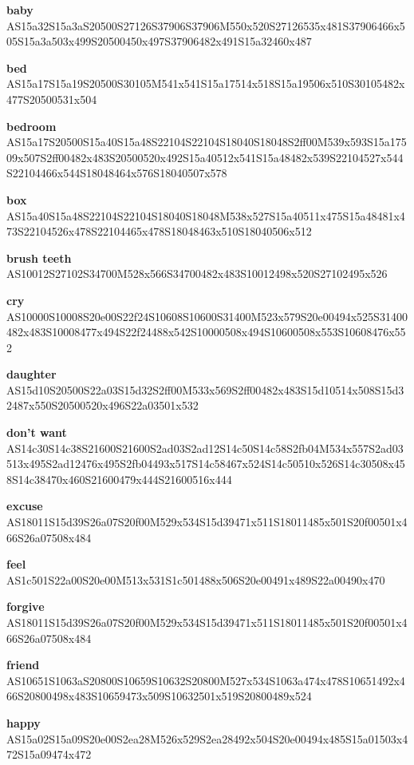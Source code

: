 \documentclass{article}
\begin{document}
\begin{glossary}
\textbf{baby}\\
AS15a32S15a3aS20500S27126S37906S37906M550x520S27126535x481S37906466x505S15a3a503x499S20500450x497S37906482x491S15a32460x487

\textbf{bed}\\
AS15a17S15a19S20500S30105M541x541S15a17514x518S15a19506x510S30105482x477S20500531x504

\textbf{bedroom}\\
AS15a17S20500S15a40S15a48S22104S22104S18040S18048S2ff00M539x593S15a17509x507S2ff00482x483S20500520x492S15a40512x541S15a48482x539S22104527x544S22104466x544S18048464x576S18040507x578

\textbf{box}\\
AS15a40S15a48S22104S22104S18040S18048M538x527S15a40511x475S15a48481x473S22104526x478S22104465x478S18048463x510S18040506x512

\textbf{brush teeth}\\
AS10012S27102S34700M528x566S34700482x483S10012498x520S27102495x526

\textbf{cry}\\
AS10000S10008S20e00S22f24S10608S10600S31400M523x579S20e00494x525S31400482x483S10008477x494S22f24488x542S10000508x494S10600508x553S10608476x552

\textbf{daughter}\\
AS15d10S20500S22a03S15d32S2ff00M533x569S2ff00482x483S15d10514x508S15d32487x550S20500520x496S22a03501x532

\textbf{don't want}\\
AS14c30S14c38S21600S21600S2ad03S2ad12S14c50S14c58S2fb04M534x557S2ad03513x495S2ad12476x495S2fb04493x517S14c58467x524S14c50510x526S14c30508x458S14c38470x460S21600479x444S21600516x444

\textbf{excuse}\\
AS18011S15d39S26a07S20f00M529x534S15d39471x511S18011485x501S20f00501x466S26a07508x484

\textbf{feel}\\
AS1c501S22a00S20e00M513x531S1c501488x506S20e00491x489S22a00490x470

\textbf{forgive}\\
AS18011S15d39S26a07S20f00M529x534S15d39471x511S18011485x501S20f00501x466S26a07508x484

\textbf{friend}\\
AS10651S1063aS20800S10659S10632S20800M527x534S1063a474x478S10651492x466S20800498x483S10659473x509S10632501x519S20800489x524

\textbf{happy}\\
AS15a02S15a09S20e00S2ea28M526x529S2ea28492x504S20e00494x485S15a01503x472S15a09474x472


\end{glossary}
\end{document}
